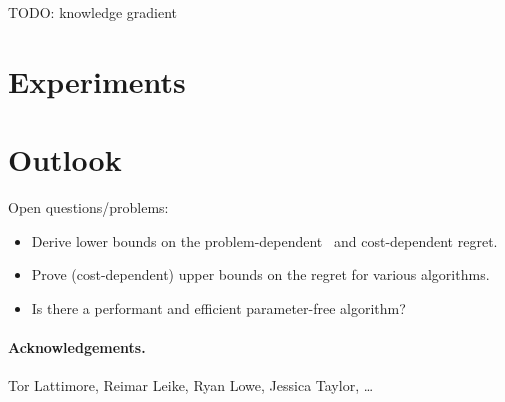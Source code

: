 \documentclass[a4paper]{article}
\begin{document}
TODO: knowledge gradient



\section{Experiments}

\iffalse
Algorithms:
* vanilla DMED (with commitment when 1 arm is selected?)
* partial monitoring algorithm (?)
* optimal stopping time (optimized problem-dependent)
* heuristic (with optimized alpha)

Problems:
* medium query cost c = 2 (>> gap)
  * horizon n = 10k vs gap 0.1 (< n^2/3)
  * horizon n = 1k vs gap 0.1 (~ n^2/3)
  * horizon n = 10k vs gap 0.01 (don't identify the arms)
* high query cost c = 50
  * horizon n = 10k vs gap 0.3 (pay to identify)
  * horizon n = 10k vs gap 0.1 (borderline case)
  * horizon n = 10k vs gap 0.05 (do not pay to identify)
* low query cost c = 0.01 (c << gap)
  * horizon n = 10k vs gap 0.1 (should almost always find the best arm)
  * horizon n = 200 vs gap 0.1 (query all the way?)
\fi


\section{Outlook}

Open questions/problems:
\begin{itemize}
\item Derive lower bounds on the problem-dependent~\citep[Thm.~2.2]{Bubeck12}
    and cost-dependent regret.
\item Prove (cost-dependent) upper bounds
    on the regret for various algorithms.
\item Is there a performant and efficient parameter-free algorithm?
\end{itemize}


\paragraph{Acknowledgements.}
Tor Lattimore, Reimar Leike, Ryan Lowe, Jessica Taylor, \dots


\end{document}
